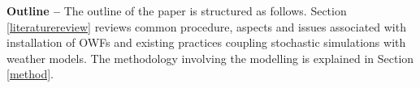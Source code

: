 \textbf{Outline --}
The outline of the paper is structured as follows. Section \ref{literaturereview} reviews common procedure, aspects and issues associated with installation of OWFs and existing practices coupling stochastic simulations with weather models. The methodology involving the modelling is explained in Section \ref{method}.